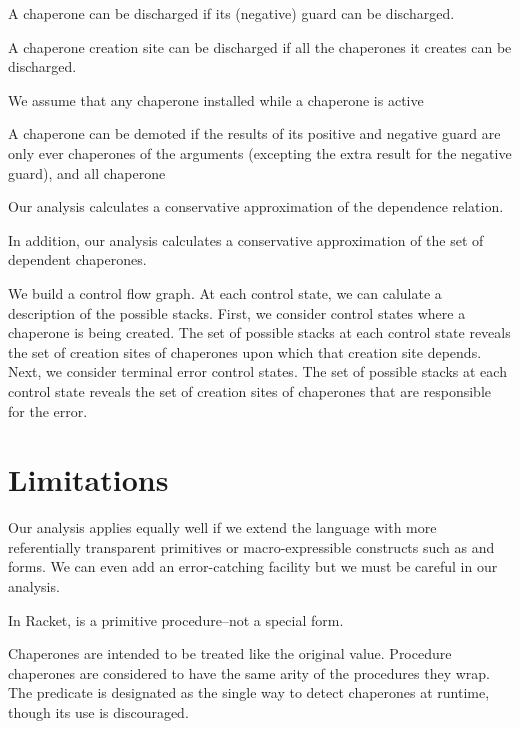 \documentclass{sigplanconf}
\begin{document}

A chaperone can be discharged if its (negative) guard can be discharged.

A chaperone creation site can be discharged if all the chaperones it creates can be discharged.

We assume that any chaperone installed while a chaperone is active 

A chaperone can be demoted if the results of its positive and negative guard are only ever chaperones of the arguments (excepting the extra result for the negative guard), and all chaperone 

Our analysis calculates a conservative approximation of the dependence relation.

In addition, our analysis calculates a conservative approximation of the set of dependent chaperones.

We build a control flow graph.
At each control state, we can calulate a description of the possible stacks.
First, we consider control states where a chaperone is being created.
The set of possible stacks at each control state reveals the set of creation sites of chaperones upon which that creation site depends.
Next, we consider terminal error control states.
The set of possible stacks at each control state reveals the set of creation sites of chaperones that are responsible for the error.

\section{Limitations}

Our analysis applies equally well if we extend the language with more referentially transparent primitives or macro-expressible constructs such as  and  forms.
We can even add an error-catching facility but we must be careful in our analysis.

In Racket,  is a primitive procedure--not a special form.

Chaperones are intended to be treated like the original value.
Procedure chaperones are considered to have the same arity of the procedures they wrap.
The  predicate is designated as the single way to detect chaperones at runtime, though its use is discouraged.
\end{document}
